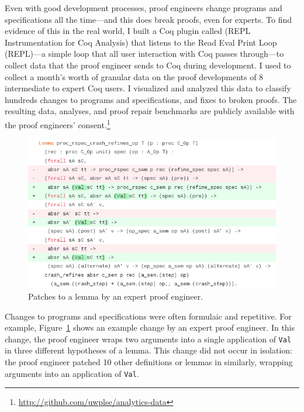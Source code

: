 Even with good development processes, proof engineers change programs and specifications all the time---and this does break proofs, even for experts.
To find evidence of this in the real world, I built a Coq plugin called \toolname 
(REPL Instrumentation for Coq Analysis) that listens to the Read Eval Print
Loop (REPL)---a simple loop that all user interaction with Coq passes through---to collect data that the proof engineer sends to Coq during development.
I used \toolname to collect a month's worth of granular data on 
the proof developments of 8 intermediate to expert Coq users.
I visualized and analyzed this data to classify hundreds changes to programs and specifications,
and fixes to broken proofs.
The resulting data, analyses, and proof repair benchmarks are publicly available with the proof engineers' 
consent.\footnote{\url{http://github.com/uwplse/analytics-data}}

\begin{figure}
  \includegraphics[width=1.0\textwidth]{maintenance/fig/patch.png}
  \caption{Patches to a lemma by an expert proof engineer.}
  \label{fig:patch}
\end{figure}

Changes to programs and specifications were often formulaic and repetitive.
For example, Figure~\ref{fig:patch} shows an example change by an expert proof engineer.
In this change, the proof engineer wraps two arguments into a single application of \lstinline{Val}
in three different hypotheses of a lemma.
This change did not occur in isolation: the proof engineer patched 10 other definitions or lemmas
in similarly, wrapping arguments into an application of
\lstinline{Val}.

